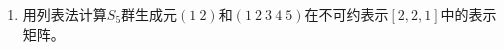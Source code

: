 \documentclass[reqno,a4paper,12pt]{amsart}
\begin{document}
\begin{enumerate}[1.]
\begin{proof}
其中
\[
	P_1 = (7 \ 4) (3 \ 5 \ 9) (6 \ 8); \ \ Q_1 = (8 \ 5) (9 \ 4).
\]

或者
\begin{align*}
	R =& (4 \ 3 \ 5 \ 6 \ 8 \ 9 \ 7) \\
	=& (4 \ 3) (3 \ 5 \ 6 \ 8 \ 9 \ 7) = (4 \ 3)(5 \ 6)(6 \ 8 \ 9 \ 7)(7 \ 3) \\
	=& (4 \ 3)(5 \ 6)(7 \ 6)(6 \ 8 \ 9)(7 \ 3) = (4 \ 3)(5 \ 6 \ 7)(8 \ 9)(9 \ 6)(7 \ 3).
\end{align*}

其中
\[
	P_2 = (4 \ 3)(5 \ 6 \ 7)(8 \ 9); \ \ Q_2 = (9 \ 6)(7 \ 3).
\]
\end{proof}

\item 用列表法计算$S_5$群生成元$(1 \ 2)$和$(1 \ 2 \ 3 \ 4 \ 5)$在不可约表示$[2,2,1]$中的表示矩阵。


\end{enumerate}
\end{document}
